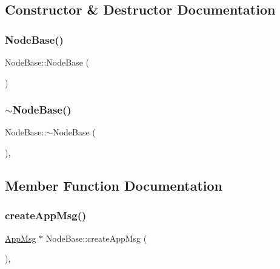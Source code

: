 \subsection{Constructor \& Destructor Documentation}
\mbox{\label{class_node_base_ab6ea4e77947d5b9b8da66d37dc432e7f}} 
\subsubsection{\texorpdfstring{Node\+Base()}{NodeBase()}}
{\footnotesize\ttfamily Node\+Base\+::\+Node\+Base (\begin{DoxyParamCaption}{ }\end{DoxyParamCaption})\hspace{0.3cm}{\ttfamily [protected]}}

\mbox{\label{class_node_base_a2fd7f7080282b6af95ba0b09fd30679d}} 
\subsubsection{\texorpdfstring{$\sim$\+Node\+Base()}{~NodeBase()}}
{\footnotesize\ttfamily Node\+Base\+::$\sim$\+Node\+Base (\begin{DoxyParamCaption}{ }\end{DoxyParamCaption})\hspace{0.3cm}{\ttfamily [protected]}, {\ttfamily [virtual]}}



\subsection{Member Function Documentation}
\mbox{\label{class_node_base_ac8b9e21b1cc32fd86aaa6c956b93a7c3}} 
\subsubsection{\texorpdfstring{create\+App\+Msg()}{createAppMsg()}}
{\footnotesize\ttfamily \hyperlink{class_app_msg}{App\+Msg} $\ast$ Node\+Base\+::create\+App\+Msg (\begin{DoxyParamCaption}{ }\end{DoxyParamCaption})\hspace{0.3cm}{\ttfamily [protected]}, {\ttfamily [virtual]}}



